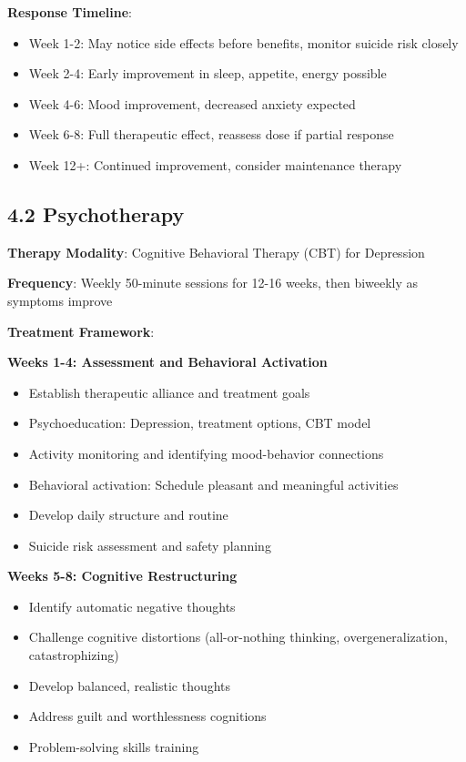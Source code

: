 \documentclass[11pt,letterpaper]{article}
\begin{document}
\textbf{Response Timeline}:
\begin{itemize}[leftmargin=*]
    \item Week 1-2: May notice side effects before benefits, monitor suicide risk closely
    \item Week 2-4: Early improvement in sleep, appetite, energy possible
    \item Week 4-6: Mood improvement, decreased anxiety expected
    \item Week 6-8: Full therapeutic effect, reassess dose if partial response
    \item Week 12+: Continued improvement, consider maintenance therapy
\end{itemize}

\subsection*{4.2 Psychotherapy}

\textbf{Therapy Modality}: Cognitive Behavioral Therapy (CBT) for Depression

\textbf{Frequency}: Weekly 50-minute sessions for 12-16 weeks, then biweekly as symptoms improve

\textbf{Treatment Framework}:

\textbf{Weeks 1-4: Assessment and Behavioral Activation}
\begin{itemize}[leftmargin=*]
    \item Establish therapeutic alliance and treatment goals
    \item Psychoeducation: Depression, treatment options, CBT model
    \item Activity monitoring and identifying mood-behavior connections
    \item Behavioral activation: Schedule pleasant and meaningful activities
    \item Develop daily structure and routine
    \item Suicide risk assessment and safety planning
\end{itemize}

\textbf{Weeks 5-8: Cognitive Restructuring}
\begin{itemize}[leftmargin=*]
    \item Identify automatic negative thoughts
    \item Challenge cognitive distortions (all-or-nothing thinking, overgeneralization, catastrophizing)
    \item Develop balanced, realistic thoughts
    \item Address guilt and worthlessness cognitions
    \item Problem-solving skills training
\end{itemize}
\end{document}
